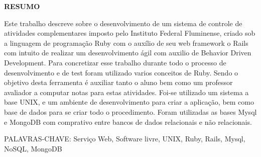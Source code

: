 \begin{center}
\textbf{RESUMO}
\end{center}
\singlespacing

\noindent Este trabalho descreve sobre o desenvolvimento de um sistema de controle de atividades complementares imposto pelo Instituto Federal Fluminense, 
criado sob a linguagem de programação Ruby com o auxílio de seu web framework o Rails com intuito de realizar um desenvolvimento ágil com auxilio de 
Behavior Driven Development. Para concretizar esse trabalho durante todo o processo de desenvolvimento e de test foram utilizado varios conceitos de Ruby. 
Sendo o objetivo desta ferramenta é auxiliar tanto o aluno bem como um professor avaliador a computar notas para estas atividades. Foi-se utilizado um sistema 
a base UNIX, e um ambiente de desenvolvimento para criar a aplicação, bem como base de dados para se criar todo o procedimento. 
Foram utilizadas as bases Mysql e MongoDB com comprativo entre bancos de dados relacionais e não relacionais.

\noindent PALAVRAS-CHAVE:  Serviço Web, Software livre, UNIX,  Ruby, Rails, Mysql, NoSQL, MongoDB 
